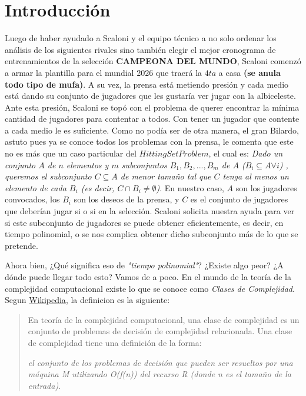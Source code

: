 \section{Introducción}

Luego de haber ayudado a Scaloni y el equipo técnico a no solo ordenar los análisis de los siguientes rivales sino también elegir el mejor cronograma de entrenamientos de la selección \textbf{CAMPEONA DEL MUNDO}, Scaloni comenzó a armar la plantilla para el mundial 2026 que traerá la $4ta$ a casa \textbf{(se anula todo tipo de mufa)}. A su vez, la prensa está metiendo presión y cada medio está dando su conjunto de jugadores que les gustaría ver jugar con la albiceleste. Ante esta presión, Scaloni se topó con el problema de querer encontrar la mínima cantidad de jugadores para contentar a todos. Con tener un jugador que contente a cada medio le es suficiente.
Como no podía ser de otra manera, el gran Bilardo, astuto pues ya se conoce todos los problemas con la prensa, le comenta que este no es más que un caso particular del $Hitting Set Problem$, el cual es:
\textit{Dado un conjunto $A$ de $n$ elementos y $m$ subconjuntos $B_1, B_2, ..., B_m$ de $A$ ($B_i \subseteq A \forall i$) , queremos el subconjunto $C \subseteq A$ de menor tamaño tal que $C$ tenga al menos un elemento de cada $B_i$ (es decir, $C \cap B_i \neq \emptyset$)}.
En nuestro caso, $A$ son los jugadores convocados, los $B_i$ son los deseos de la prensa, y $C$ es el conjunto de jugadores que deberían jugar si o si en la selección.
Scaloni solicita nuestra ayuda para ver si este subconjunto de jugadores se puede obtener eficientemente, es decir, en tiempo polinomial, o se nos complica obtener dicho subconjunto más de lo que se pretende.

Ahora bien, ¿Qué significa eso de \textit{"tiempo polinomial"}? ¿Existe algo peor? ¿A dónde puede llegar todo esto? Vamos de a poco.
En el mundo de la teoría de la complejidad computacional existe lo que se conoce como \textit{Clases de Complejidad}. Segun \href{https://es.wikipedia.org/wiki/Clase_de_complejidad}{Wikipedia}, la definicion es la siguiente:
\begin{quote}
En teoría de la complejidad computacional, una clase de complejidad es un conjunto de problemas de decisión de complejidad relacionada. Una clase de complejidad tiene una definición de la forma:

\textit{el conjunto de los problemas de decisión que pueden ser resueltos por una máquina M utilizando O(f(n)) del recurso R (donde n es el tamaño de la entrada)}.
\end{quote}

